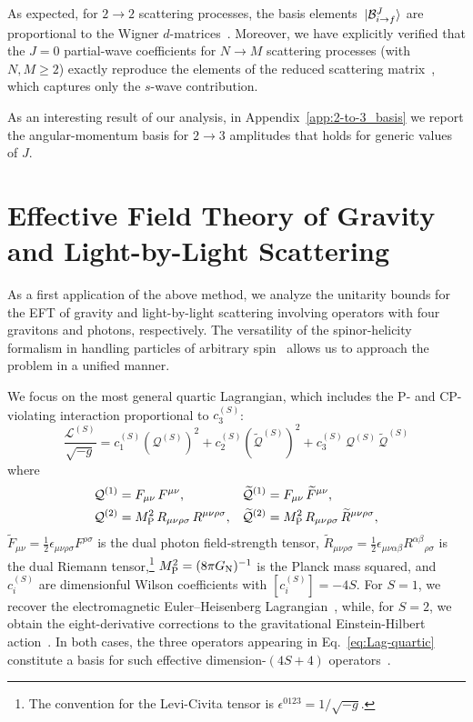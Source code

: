 As expected, for $2\to 2$ scattering processes, the basis elements $\ket*{\mathcal B^{J}_{i\to f}}$ are proportional to the Wigner $d$-matrices~\cite{Jiang:2020rwz}. 
Moreover, we have explicitly verified that the $J=0$
partial-wave coefficients for $N\to M$ scattering processes (with $N,M \geq 2$) exactly reproduce the elements of the reduced scattering matrix~\cite{Chang:2019vez,Falkowski:2019tft,Cohen:2021ucp,Mahmud:2025wye}, which captures only the $s$-wave contribution.

As an interesting result of our analysis, in Appendix~\ref{app:2-to-3_basis} we report the angular-momentum basis for $2 \to 3$ amplitudes that holds for generic values of $J$.

\section{Effective Field Theory of Gravity and Light-by-Light Scattering\label{sec:PWUBgravity}}

As a first application of the above method, we analyze the unitarity bounds for the EFT of gravity and light-by-light scattering involving operators with four gravitons and photons, respectively.
%
The versatility of the spinor-helicity formalism in handling particles of arbitrary spin~\cite{Arkani-Hamed:2017jhn} allows us to approach the problem in a unified manner.

We focus on the most general quartic Lagrangian, which includes the P- and CP-violating interaction proportional to $c_3^{(S)}$:
\begin{equation}
\label{eq:Lag-quartic}
    \frac{\mathcal L^{(S)}}{\sqrt{-g}} = c_1^{(S)}\left( \mathcal Q^{(S)}\right)^2 + c_2^{(S)}\left(\widetilde{\mathcal Q}^{(S)}\right)^2 + c_3^{(S)}\,  \mathcal Q^{(S)} \,\widetilde{\mathcal Q}^{(S)}
\end{equation}
%
where
%
\begin{align}
    \mathcal Q^{(1)} &= F_{\mu\nu}\,F^{\mu\nu},
    &
    \widetilde{\mathcal Q}^{(1)} &= F_{\mu\nu}\,\widetilde F^{\mu\nu},\\
    \mathcal Q^{(2)} &= M_{\text{P}}^2\, R_{\mu\nu\rho\sigma}\,R^{\mu\nu\rho\sigma},
    &
    \widetilde{\mathcal Q}^{(2)} &= M_{\text{P}}^2\, R_{\mu\nu\rho\sigma}\,\widetilde R^{\mu\nu\rho\sigma},
\end{align}
%
$\widetilde F_{\mu\nu}=\frac{1}{2} \epsilon_{\mu\nu\rho\sigma}F^{\rho\sigma}$ is the dual photon field-strength tensor, $\widetilde R_{\mu\nu\rho\sigma} = \frac{1}{2} \epsilon_{\mu\nu\alpha\beta}R^{\alpha\beta}{}_{\rho\sigma}$ is the dual Riemann tensor,\footnote{The convention for the Levi-Civita tensor is $\epsilon^{0123}=1/\sqrt{-g}$.} $M_{\text{P}}^2=(8\pi G_{\text{N}})^{-1}$ is the Planck mass squared,
and $c_i^{(S)}$ are dimensionful Wilson coefficients with $[c_i^{(S)}]=-4S$. 
%
For $S=1$, we recover the electromagnetic Euler--Heisenberg Lagrangian~\cite{Heisenberg:1936nmg}, while, for $S=2$, we obtain the eight-derivative corrections to the gravitational Einstein-Hilbert action~\cite{Endlich:2017tqa}.
In both cases, the three operators appearing in Eq.~\eqref{eq:Lag-quartic} constitute 
a basis for such effective dimension-$(4S+4)$ operators~\cite{Ruhdorfer:2019qmk,Li:2023wdz}.


